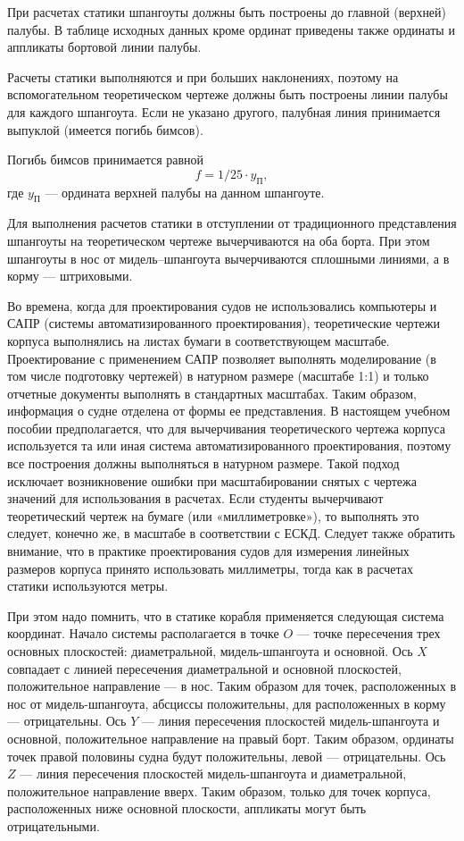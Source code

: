 При расчетах статики шпангоуты должны быть построены до главной (верхней) палубы.
В таблице исходных данных кроме ординат приведены также ординаты и аппликаты бортовой линии палубы.

Расчеты статики выполняются и при больших наклонениях, поэтому на вспомогательном теоретическом чертеже должны быть построены линии палубы для каждого шпангоута.
Если не указано другого, палубная линия принимается выпуклой (имеется погибь бимсов).

Погибь бимсов принимается равной
\begin{equation}
    f = 1/25 \cdot y_{\text{П}},
\end{equation}
где $y_{\text{П}}$ — ордината верхней палубы на данном шпангоуте.

Для выполнения расчетов статики в отступлении от традиционного представления шпангоуты на теоретическом чертеже вычерчиваются на оба борта.
При этом шпангоуты в нос от мидель–шпангоута вычерчиваются сплошными линиями, а в корму — штриховыми.

Во времена, когда для проектирования судов не использовались компьютеры и САПР (системы автоматизированного проектирования), теоретические чертежи корпуса выполнялись на листах бумаги в соответствующем масштабе.
Проектирование с применением САПР позволяет выполнять моделирование (в том числе подготовку чертежей) в натурном размере (масштабе 1:1) и только отчетные документы выполнять в стандартных масштабах.
Таким образом, информация о судне отделена от формы ее представления.
В настоящем учебном пособии предполагается, что для вычерчивания теоретического чертежа корпуса используется та или иная система автоматизированного проектирования, поэтому все построения должны выполняться в натурном размере.
Такой подход исключает возникновение ошибки при масштабировании снятых с чертежа значений для использования в расчетах.
Если студенты вычерчивают теоретический чертеж на бумаге (или «миллиметровке»), то выполнять это следует, конечно же, в масштабе в соответствии с ЕСКД.
Следует также обратить внимание, что в практике проектирования судов для измерения линейных размеров корпуса принято использовать миллиметры, тогда как в расчетах статики используются метры.

При этом надо помнить, что в статике корабля применяется следующая система координат.
Начало системы располагается в точке $O$ --- точке пересечения трех основных плоскостей: диаметральной, мидель-шпангоута и основной.
Ось $X$ совпадает с линией пересечения диаметральной и основной плоскостей, положительное направление --- в нос.
Таким образом для точек, расположенных в нос от мидель-шпангоута, абсциссы положительны, для расположенных в корму --- отрицательны.
Ось $Y$ --- линия пересечения плоскостей мидель-шпангоута и основной, положительное направление на правый борт.
Таким образом, ординаты точек правой половины судна будут положительны, левой --- отрицательны.
Ось $Z$ --- линия пересечения плоскостей мидель-шпангоута и диаметральной, положительное направление вверх.
Таким образом, только для точек корпуса, расположенных ниже основной плоскости, аппликаты могут быть отрицательными.

